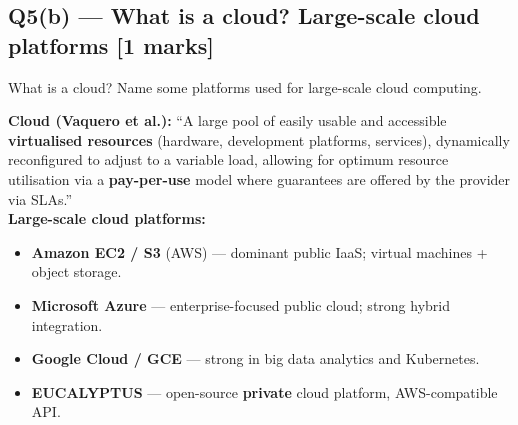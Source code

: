 \documentclass[12pt, a4paper]{article}
\newenvironment{qbox}{\begin{mdframed}[style=qframe]}{\end{mdframed}}
\newenvironment{solbox}{\begin{mdframed}[style=solframe]}{\end{mdframed}}
\newcommand{\qmarks}[1]{\hfill\textbf{\color{orange!70!black}[#1 marks]}}
\begin{document}
\subsection{Q5(b) --- What is a cloud? Large-scale cloud platforms
  \texorpdfstring{\qmarks{1}}{}}
\begin{qbox}What is a cloud? Name some platforms used for large-scale cloud computing.\end{qbox}
\begin{solbox}
\textbf{Cloud (Vaquero et al.):} ``A large pool of easily usable and accessible
\textbf{virtualised resources} (hardware, development platforms, services), dynamically
reconfigured to adjust to a variable load, allowing for optimum resource utilisation via a
\textbf{pay-per-use} model where guarantees are offered by the provider via SLAs.''\\[4pt]

\textbf{Large-scale cloud platforms:}
\begin{itemize}[leftmargin=1.4cm, itemsep=1pt]
  \item \textbf{Amazon EC2 / S3} (AWS) --- dominant public IaaS; virtual machines + object
    storage.
  \item \textbf{Microsoft Azure} --- enterprise-focused public cloud; strong hybrid
    integration.
  \item \textbf{Google Cloud / GCE} --- strong in big data analytics and Kubernetes.
  \item \textbf{EUCALYPTUS} --- open-source \textbf{private} cloud platform, AWS-compatible
    API.
\end{itemize}
\end{solbox}

\end{document}
